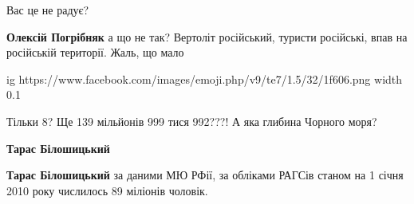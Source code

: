 \begin{itemize}
Вас це не радує?


 
\textbf{Олексій Погрібняк} а що не так? Вертоліт російський, туристи російські, впав на російській території. Жаль, що мало


\ifcmt
  ig https://www.facebook.com/images/emoji.php/v9/te7/1.5/32/1f606.png
  width 0.1
\fi

 
Тільки 8? Ще 139 мільйонів 999 тися 992???! А яка глибина Чорного моря?

\begin{itemize}
 
\textbf{Тарас Білошицький} 🤣🤣🤣🤣🔥🔥🔥

 
\textbf{Тарас Білошицький} за даними МЮ РФії, за обліками РАГСів станом на 1 січня 2010 року числилось 89 міліонів чоловік.

\begin{itemize}
 

\end{itemize}
\end{itemize}
\end{itemize}
